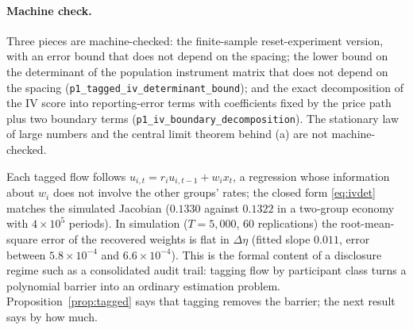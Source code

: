 \documentclass[12pt]{article}
\theoremstyle{definition}
\theoremstyle{remark}
\begin{document}
\paragraph{Machine check.} Three pieces are machine-checked: the finite-sample reset-experiment version, with an error bound that does not depend on the spacing; the lower bound on the determinant of the population instrument matrix that does not depend on the spacing (\texttt{p1\_tagged\_iv\_determinant\_bound}); and the exact decomposition of the IV score into reporting-error terms with coefficients fixed by the price path plus two boundary terms (\texttt{p1\_iv\_boundary\_decomposition}). The stationary law of large numbers and the central limit theorem behind (a) are not machine-checked.


Each tagged flow follows $u_{i,t}=r_iu_{i,t-1}+w_ix_t$, a regression whose information about $w_i$ does not involve the other groups' rates; the closed form \eqref{eq:ivdet} matches the simulated Jacobian ($0.1330$ against $0.1322$ in a two-group economy with $4\times10^5$ periods). In simulation ($T=5{,}000$, 60 replications) the root-mean-square error of the recovered weights is flat in $\Delta\eta$ (fitted slope $0.011$, error between $5.8\times10^{-4}$ and $6.6\times10^{-4}$). This is the formal content of a disclosure regime such as a consolidated audit trail: tagging flow by participant class turns a polynomial barrier into an ordinary estimation problem.
Proposition~\ref{prop:tagged} says that tagging removes the barrier; the next result says by how much.
\end{document}
